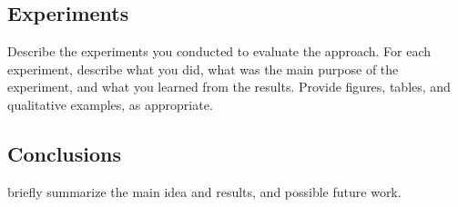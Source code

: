 \documentclass[10pt,twocolumn,letterpaper]{article}
\begin{document}
\subsection{Experiments}

Describe the experiments you conducted to evaluate the approach.  For each
experiment, describe what you did, what was the main purpose of the experiment,
and what you learned from the results. Provide figures, tables, and qualitative
examples, as appropriate.

\subsection{Conclusions}

briefly summarize the main idea and results, and possible future work.

{\small


}
\end{document}
